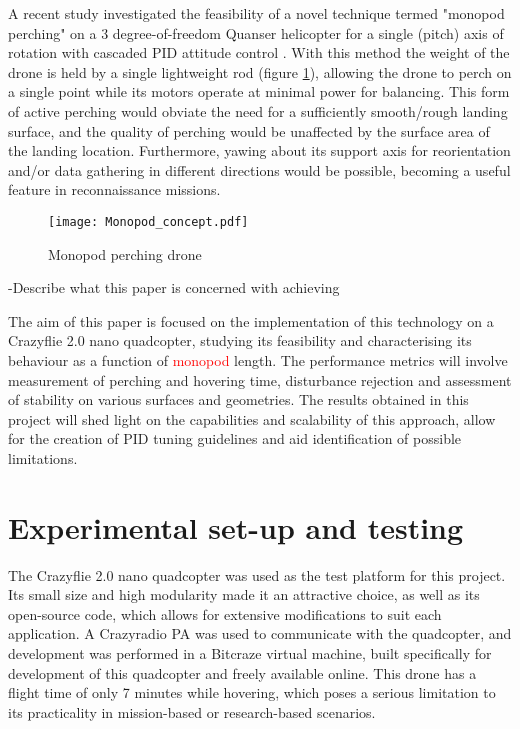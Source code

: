 \documentclass[12pt,a4paper]{article}
\begin{document}
A recent study investigated the feasibility of a novel technique termed "monopod perching" on a 3 degree-of-freedom Quanser helicopter for a single (pitch) axis of rotation with cascaded PID attitude control \cite{Hao}. With this method the weight of the drone is held by a single lightweight rod (figure \ref{fig1}), allowing the drone to perch on a single point while its motors operate at minimal power for balancing. This form of active perching would obviate the need for a sufficiently smooth/rough landing surface, and the quality of perching would be unaffected by the surface area of the landing location. Furthermore, yawing about its support axis for reorientation and/or data gathering in different directions would be possible, becoming a useful feature in reconnaissance missions.

\begin{figure}[h!]
\centering
 \texttt{[image: Monopod\_concept.pdf]}
  \caption{Monopod perching drone}
  \label{fig1}
\end{figure}


-Describe what this paper is concerned with achieving


The aim of this paper is focused on the implementation of this technology on a Crazyflie 2.0 nano quadcopter, studying its feasibility and characterising its behaviour as a function of \textcolor{red}{monopod} length. The performance metrics will involve measurement of perching and hovering time, disturbance rejection and assessment of stability on various surfaces and geometries. The results obtained in this project will shed light on the capabilities and scalability of this approach, allow for the creation of PID tuning guidelines and aid identification of possible limitations.




\section{Experimental set-up and testing}
The Crazyflie 2.0 nano quadcopter was used as the test platform for this project. Its small size and high modularity made it an attractive choice, as well as its open-source code, which allows for extensive modifications to suit each application. A Crazyradio PA was used to communicate with the quadcopter, and development was performed in a Bitcraze virtual machine, built specifically for development of this quadcopter and freely available online. This drone has a flight time of only 7 minutes while hovering, which poses a serious limitation to its practicality in mission-based or research-based scenarios.
	
\end{document}
